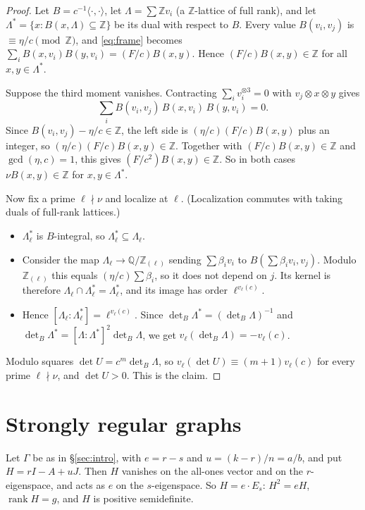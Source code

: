 \documentclass[11pt]{article}
\theoremstyle{definition}
\theoremstyle{remark}
\newcommand{\Z}{\mathbb Z}
\newcommand{\Q}{\mathbb Q}
\newcommand{\ip}[2]{\langle #1,#2\rangle}
\begin{document}
\begin{proof}
Let $B=c^{-1}\ip{\cdot}{\cdot}$, let $\Lambda=\sum\Z v_i$ (a $\Z$-lattice of full
rank), and let $\Lambda^*=\{x:B(x,\Lambda)\subseteq\Z\}$ be its dual with respect to $B$.
Every value $B(v_i,v_j)$ is $\equiv\eta/c\pmod\Z$, and \eqref{eq:frame} becomes
$\sum_iB(x,v_i)B(y,v_i)=(F/c)B(x,y)$. Hence $(F/c)B(x,y)\in\Z$ for all
$x,y\in \Lambda^*$.

Suppose the third moment vanishes. Contracting $\sum_iv_i^{\otimes3}=0$ with
$v_j\otimes x\otimes y$ gives
\[
 \sum_iB(v_i,v_j)\,B(x,v_i)\,B(y,v_i)=0 .
\]
Since $B(v_i,v_j)-\eta/c\in\Z$, the left side is
$(\eta/c)(F/c)B(x,y)$ plus an integer, so $(\eta/c)(F/c)B(x,y)\in\Z$. Together
with $(F/c)B(x,y)\in\Z$ and $\gcd(\eta,c)=1$, this gives
$(F/c^2)B(x,y)\in\Z$. So in both cases $\nu B(x,y)\in\Z$ for $x,y\in \Lambda^*$.

Now fix a prime $\ell\nmid\nu$ and localize at $\ell$. (Localization commutes
with taking duals of full-rank lattices.)
\begin{itemize}
\item $\Lambda^*_\ell$ is $B$-integral, so $\Lambda^*_\ell\subseteq \Lambda_\ell$.
\item Consider the map $\Lambda_\ell\to\Q/\Z_{(\ell)}$ sending $\sum \beta_iv_i$ to
$B(\sum \beta_iv_i,v_j)$. Modulo $\Z_{(\ell)}$ this equals $(\eta/c)\sum \beta_i$, so it
does not depend on $j$. Its kernel is therefore $\Lambda_\ell\cap \Lambda^*_\ell=\Lambda^*_\ell$,
and its image has order $\ell^{v_\ell(c)}$.
\item Hence $[\Lambda_\ell:\Lambda^*_\ell]=\ell^{v_\ell(c)}$. Since
$\det_B\Lambda^*=(\det_B\Lambda)^{-1}$ and $\det_B\Lambda^*=[\Lambda:\Lambda^*]^2\det_B\Lambda$, we get
$v_\ell(\det_B\Lambda)=-v_\ell(c)$.
\end{itemize}
Modulo squares $\det U=c^m\det_B\Lambda$, so $v_\ell(\det U)\equiv(m+1)v_\ell(c)$ for
every prime $\ell\nmid\nu$, and $\det U>0$. This is the claim.
\end{proof}

\section{Strongly regular graphs}\label{sec:srg}

Let $\Gamma$ be as in \S\ref{sec:intro}, with $e=r-s$ and $u=(k-r)/n=a/b$, and
put $H=rI-A+uJ$. Then $H$ vanishes on the all-ones vector and on the
$r$-eigenspace, and acts as $e$ on the $s$-eigenspace. So $H=e\cdot E_s$:
$H^2=eH$, $\operatorname{rank}H=g$, and $H$ is positive semidefinite.
\end{document}
